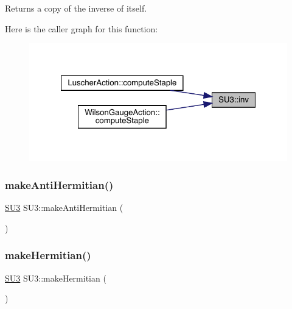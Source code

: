 \begin{DoxyReturn}{Returns}
a copy of the inverse of itself. 
\end{DoxyReturn}
Here is the caller graph for this function\+:
\nopagebreak
\begin{figure}[H]
\begin{center}
\leavevmode
\includegraphics[width=321pt]{class_s_u3_ad0e19706d3c6fdb50dcf788d4b48eb4c_icgraph}
\end{center}
\end{figure}
\mbox{\label{class_s_u3_a25e7cd46d60f25138585b76115e791a3}} 
\subsubsection{\texorpdfstring{makeAntiHermitian()}{makeAntiHermitian()}}
{\footnotesize\ttfamily \mbox{\hyperlink{class_s_u3}{S\+U3}} S\+U3\+::make\+Anti\+Hermitian (\begin{DoxyParamCaption}{ }\end{DoxyParamCaption})\hspace{0.3cm}{\ttfamily [inline]}}

\mbox{\label{class_s_u3_a7035a3e94f6dd27ece144b42473cade9}} 
\subsubsection{\texorpdfstring{makeHermitian()}{makeHermitian()}}
{\footnotesize\ttfamily \mbox{\hyperlink{class_s_u3}{S\+U3}} S\+U3\+::make\+Hermitian (\begin{DoxyParamCaption}{ }\end{DoxyParamCaption})\hspace{0.3cm}{\ttfamily [inline]}}

